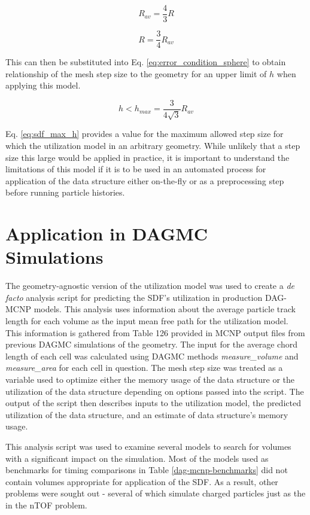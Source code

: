 $$R_{av} = \frac{4}{3}R $$

$$ R = \frac{3}{4} R_{av} $$

This can then be substituted into Eq. \ref{eq:error_condition_sphere}
to obtain relationship of the mesh step size to the geometry for an upper limit
of $h$ when applying this model.

\begin{equation}
 h < h_{max} =  \frac{3}{4\sqrt{3}} R_{av} 
\label{eq:sdf_max_h}
\end{equation}

Eq. \ref{eq:sdf_max_h} provides a value for the maximum allowed step size for
which the utilization model in an arbitrary geometry. While unlikely that a step
size this large would be applied in practice, it is important to understand the
limitations of this model if it is to be used in an automated process for
application of the data structure either on-the-fly or as a preprocessing step
before running particle histories.

\section{Application in DAGMC Simulations}

The geometry-agnostic version of the utilization model was used to create a
\textit{de facto} analysis script for predicting the SDF's utilization in
production DAG-MCNP models. This analysis uses information about the average
particle track length for each volume as the input mean free path for the
utilization model. This information is gathered from Table 126 provided in MCNP
output files from previous DAGMC simulations of the geometry. The input for the
average chord length of each cell was calculated using DAGMC methods
\textit{measure\_volume} and \textit{measure\_area} for each cell in
question. The mesh step size was treated as a variable used to optimize either
the memory usage of the data structure or the utilization of the data structure
depending on options passed into the script. The output of the script then
describes inputs to the utilization model, the predicted utilization of the data
structure, and an estimate of data structure's memory usage.

This analysis script was used to examine several models to search for volumes
with a significant impact on the simulation. Most of the models used as
benchmarks for timing comparisons in Table \ref{dag-mcnp-benchmarks} did not
contain volumes appropriate for application of the SDF. As a result, other
problems were sought out - several of which simulate charged particles just as
the in the nTOF problem.

